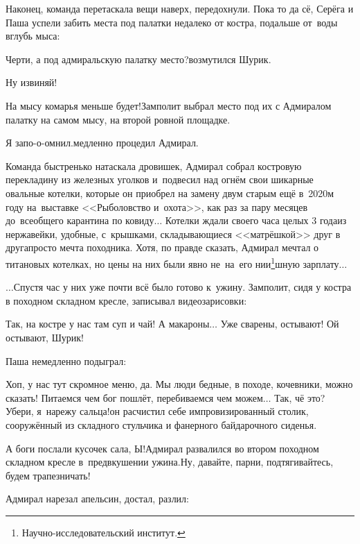 Наконец, команда перетаскала вещи наверх, передохнули. Пока то да сё, Серёга и Паша успели забить места под палатки недалеко от костра, подальше от~воды вглубь мыса:

\diagdash Черти, а под адмиральскую палатку место?\mdash возмутился Шурик.

\diagdash Ну извиняй!

\diagdash На мысу комарья меньше будет!\mdash Замполит выбрал место под их с Адмиралом палатку на самом мысу, на второй ровной площадке.

\diagdash Я запо-о-омнил.\mdash медленно процедил Адмирал.

\renewcommand*{\thefootnote}{\fnsymbol{footnote}}
\setcounter{footnote}{0}
Команда быстренько натаскала дровишек, Адмирал собрал костровую перекладину из железных уголков и~подвесил над огнём свои шикарные овальные котелки, которые он приобрел на замену двум старым ещё в~2020\sdash м году на~выставке <<Рыболовство и~охота>>, как раз за пару месяцев до~всеобщего карантина по ковиду$\ldots$ Котелки ждали своего часа целых 3 года\mdash из нержавейки, удобные, с~крышками, складывающиеся <<матрёшкой>> друг в друга\mdash просто мечта походника. Хотя, по правде сказать, Адмирал мечтал о титановых котелках, но цены на них были явно не~на~его нии\footnote{Научно-исследовательский институт.}\sdash шную зарплату$\ldots$

$\ldots$Спустя час у них уже почти всё было готово к~ужину. %
Замполит, сидя у костра в походном складном кресле, записывал видеозарисовки:

\diagdash Так, на костре у нас там суп и чай! А макароны$\ldots$ Уже сварены, остывают! Ой остывают, Шурик!

Паша немедленно подыграл:

\diagdash Хоп, у нас тут скромное меню, да. Мы люди бедные, в походе, кочевники, можно сказать! Питаемся чем бог пошлёт, перебиваемся чем можем$\ldots$ Так, чё это? Убери, я~нарежу сальца!\mdash он расчистил себе импровизированный столик, сооружённый из складного стульчика и фанерного байдарочного сиденья.

\diagdash А боги послали кусочек сала, Ы!\mdash Адмирал развалился во втором походном складном кресле в~предвкушении ужина.\mdash Ну, давайте, парни, подтягивайтесь, будем трапезничать!

Адмирал нарезал апельсин, достал, разлил: 

